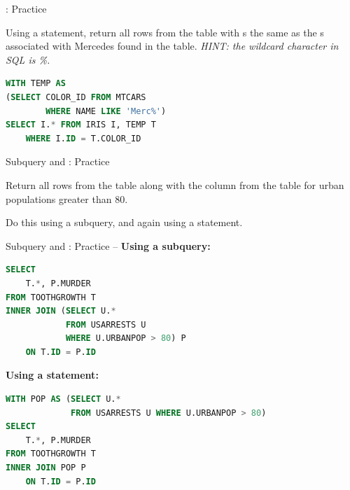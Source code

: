 \documentclass{beamer}
\begin{document}
\begin{frame}[fragile]{: Practice}
\begin{prob}
Using a  statement, return all rows from the  table with s
the same as the s associated with Mercedes found in the  table.
\textit{HINT: the wildcard character in SQL is \%.}
\end{prob}
\pause
\vspace{0.5em}
\textbf{}
\begin{lstlisting}[language=SQL]
WITH TEMP AS
(SELECT COLOR_ID FROM MTCARS
        WHERE NAME LIKE 'Merc%')
SELECT I.* FROM IRIS I, TEMP T
    WHERE I.ID = T.COLOR_ID
\end{lstlisting}
\end{frame}

\begin{frame}{Subquery and : Practice}
\begin{prob}
Return all rows from the  table along with the  column from
the  table for urban populations greater than 80.

\vspace{0.5em}
Do this using a subquery, and again using a  statement.
\end{prob}
\end{frame}

\begin{frame}[fragile]{Subquery and : Practice -- }
\textbf{Using a subquery:}
\begin{lstlisting}[language=SQL]
SELECT
    T.*, P.MURDER
FROM TOOTHGROWTH T
INNER JOIN (SELECT U.*
            FROM USARRESTS U
            WHERE U.URBANPOP > 80) P
    ON T.ID = P.ID
\end{lstlisting}
\vspace{0.3em}
\textbf{Using a  statement:}
\begin{lstlisting}[language=SQL]
WITH POP AS (SELECT U.*
             FROM USARRESTS U WHERE U.URBANPOP > 80)
SELECT
    T.*, P.MURDER
FROM TOOTHGROWTH T
INNER JOIN POP P
    ON T.ID = P.ID
\end{lstlisting}
\end{frame}
\end{document}
